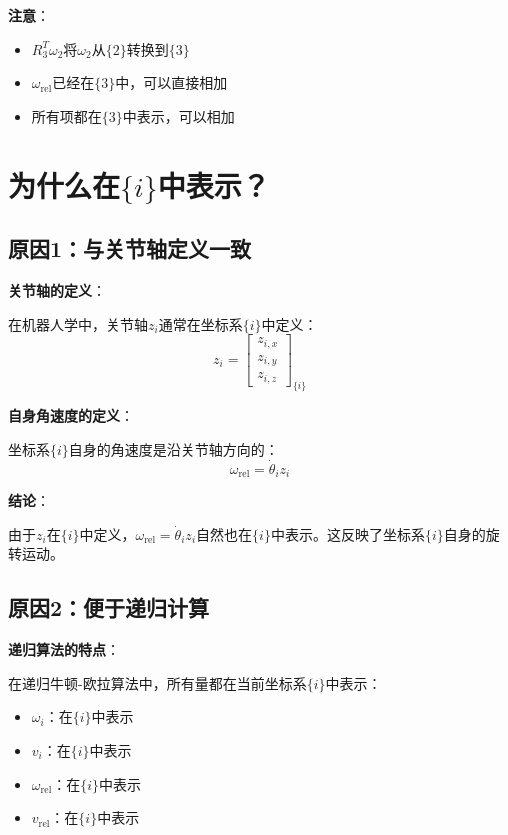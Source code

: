 \documentclass[12pt,a4paper]{article}
\begin{document}
\textbf{注意}：
\begin{itemize}
\item $R_3^T \omega_2$将$\omega_2$从$\{2\}$转换到$\{3\}$
\item $\omega_{\text{rel}}$已经在$\{3\}$中，可以直接相加
\item 所有项都在$\{3\}$中表示，可以相加
\end{itemize}

\section{为什么在$\{i\}$中表示？}

\subsection{原因1：与关节轴定义一致}

\textbf{关节轴的定义}：

在机器人学中，关节轴$z_i$通常在坐标系$\{i\}$中定义：
\begin{equation}
z_i = \begin{bmatrix} z_{i,x} \\ z_{i,y} \\ z_{i,z} \end{bmatrix}_{\{i\}}
\end{equation}

\textbf{自身角速度的定义}：

坐标系$\{i\}$自身的角速度是沿关节轴方向的：
\begin{equation}
\omega_{\text{rel}} = \dot{\theta}_i z_i
\end{equation}

\textbf{结论}：

由于$z_i$在$\{i\}$中定义，$\omega_{\text{rel}} = \dot{\theta}_i z_i$自然也在$\{i\}$中表示。这反映了坐标系$\{i\}$自身的旋转运动。

\subsection{原因2：便于递归计算}

\textbf{递归算法的特点}：

在递归牛顿-欧拉算法中，所有量都在当前坐标系$\{i\}$中表示：
\begin{itemize}
\item $\omega_i$：在$\{i\}$中表示
\item $v_i$：在$\{i\}$中表示
\item $\omega_{\text{rel}}$：在$\{i\}$中表示
\item $v_{\text{rel}}$：在$\{i\}$中表示
\end{itemize}
\end{document}
